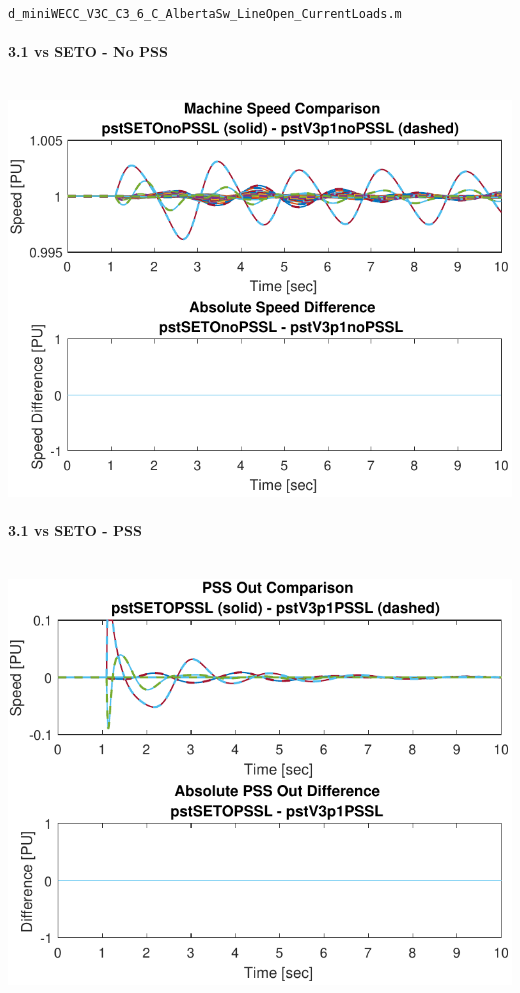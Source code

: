 \documentclass[12pt]{article}
\begin{document}
\raggedright
\begin{landscape}
\verb|d_miniWECC_V3C_C3_6_C_AlbertaSw_LineOpen_CurrentLoads.m|
\begin{multicols}{3}
\paragraph{3.1 vs SETO - No PSS} \ \\

\includegraphics[width=\linewidth]{pstSETOnoPSSLpstV3p1noPSSL}

\paragraph{3.1 vs SETO - PSS} \ \\
\includegraphics[width=\linewidth]{pstSETOPSSLpstV3p1PSSL}


\end{multicols}
\end{landscape}
\end{document}
